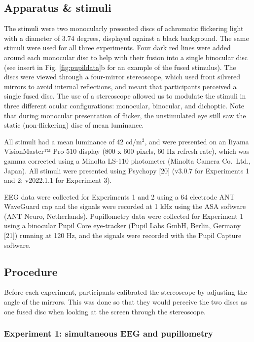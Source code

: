 \documentclass[
]{article}
\begin{document}
\hypertarget{apparatus-stimuli}{%
\subsection{Apparatus \& stimuli}\label{apparatus-stimuli}}

The stimuli were two monocularly presented discs of achromatic flickering light with a diameter of 3.74 degrees, displayed against a black background. The same stimuli were used for all three experiments. Four dark red lines were added around each monocular disc to help with their fusion into a single binocular disc (see insert in Fig. \ref{fig:pupildata}b for an example of the fused stimulus). The discs were viewed through a four-mirror stereoscope, which used front silvered mirrors to avoid internal reflections, and meant that participants perceived a single fused disc. The use of a stereoscope allowed us to modulate the stimuli in three different ocular configurations: monocular, binocular, and dichoptic. Note that during monocular presentation of flicker, the unstimulated eye still saw the static (non-flickering) disc of mean luminance.

All stimuli had a mean luminance of 42 cd/m\(^2\), and were presented on an Iiyama VisionMaster™ Pro 510 display (800 x 600 pixels, 60 Hz refresh rate), which was gamma corrected using a Minolta LS-110 photometer (Minolta Camera Co.~Ltd., Japan). All stimuli were presented using Psychopy {[}20{]} (v3.0.7 for Experiments 1 and 2; v2022.1.1 for Experiment 3).

EEG data were collected for Experiments 1 and 2 using a 64 electrode ANT WaveGuard cap and the signals were recorded at 1 kHz using the ASA software (ANT Neuro, Netherlands). Pupillometry data were collected for Experiment 1 using a binocular Pupil Core eye-tracker (Pupil Labs GmbH, Berlin, Germany {[}21{]}) running at 120 Hz, and the signals were recorded with the Pupil Capture software.

\hypertarget{procedure}{%
\subsection{Procedure}\label{procedure}}

Before each experiment, participants calibrated the stereoscope by adjusting the angle of the mirrors. This was done so that they would perceive the two discs as one fused disc when looking at the screen through the stereoscope.

\hypertarget{experiment-1-simultaneous-eeg-and-pupillometry}{%
\subsubsection{Experiment 1: simultaneous EEG and pupillometry}\label{experiment-1-simultaneous-eeg-and-pupillometry}}
\end{document}
